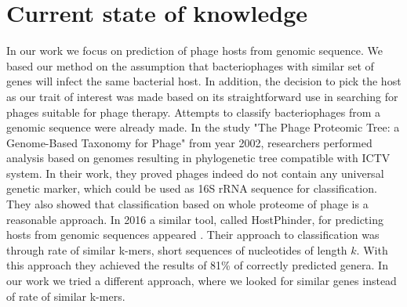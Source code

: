 
\section{Current state of knowledge}
In our work we focus on prediction of phage hosts from genomic sequence.
We based our method on the assumption that bacteriophages with similar set of genes will infect the same bacterial host.
In addition, the decision to pick the host as our trait of interest was made based on its straightforward use in searching for phages suitable for phage therapy.
Attempts to classify bacteriophages from a genomic sequence were already made.
In the study "The Phage Proteomic Tree: a Genome-Based Taxonomy for Phage"\cite{phage} from year 2002, researchers performed analysis based on genomes resulting in phylogenetic tree compatible with ICTV system.
In their work, they proved phages indeed do not contain any universal genetic marker, which could be used as 16S rRNA sequence for classification.
They also showed that classification based on whole proteome of phage is a reasonable approach.
In 2016 a similar tool, called HostPhinder, for predicting hosts from genomic sequences appeared \cite{hostphinder}.
Their approach to classification was through rate of similar k-mers, short sequences of nucleotides of length $k$.
With this approach they achieved the results of 81\% of correctly predicted genera.
In our work we tried a different approach, where we looked for similar genes instead of rate of similar k-mers.  

